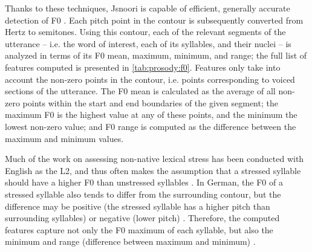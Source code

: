 	Thanks to these techniques, Jsnoori is capable of efficient, generally accurate detection of F0 
	. Each pitch point in the contour is subsequently converted from Hertz to semitones.
	Using this contour, each of the relevant segments of the utterance -- i.e. the word of interest, each of its syllables, and their nuclei -- is analyzed in terms of its F0 mean, maximum, minimum, and range;
	the full list of features computed is presented in \cref{tab:prosody:f0}.
	Features only take into account the non-zero points in the contour, i.e. points corresponding to voiced sections of the utterance. The F0 mean is calculated as the average of all non-zero points within the start and end boundaries of the given segment; the maximum F0 is the highest value at any of these points, and the minimum the lowest non-zero value; and F0 range is computed as the difference between the maximum and minimum values. 
	
	
	Much of the work on assessing non-native lexical stress has been conducted with English as the L2, and thus often makes the assumption that a stressed syllable should have a higher F0 than unstressed syllables \citep{Bonneau2011}. In German, the F0 of a stressed syllable also tends to differ from the surrounding contour, but the difference may be positive (the stressed syllable has a higher pitch than surrounding syllables) or negative (lower pitch) \citep[p.~267]{Cutler2005}. 		%
	Therefore, the computed features
	capture not only the F0 maximum of each syllable, but also the minimum and range (difference between maximum and minimum) .
	 
	



